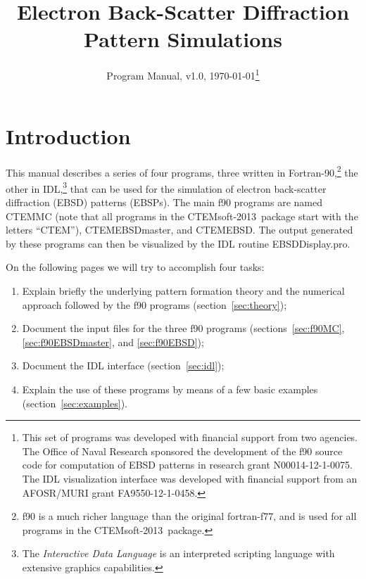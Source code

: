 \documentclass[DIV=calc, paper=letter, fontsize=11pt]{scrartcl}	 %
\title{Electron Back-Scatter Diffraction Pattern Simulations} %
\author{\vspace*{-0.7in}} %
\date{Program Manual, v1.0, \today\protect\footnote{This set of programs was developed with financial support from two agencies. 
The Office of Naval Research sponsored the development of the f90 source code for computation of EBSD patterns in research 
grant N00014-12-1-0075.  The IDL visualization interface was developed with financial support from an AFOSR/MURI grant FA9550-12-1-0458.}}
\newcommand{\ctp}{\textsf{CTEMsoft-2013}}
\begin{document}
\maketitle

\begin{figure}[h]
\leavevmode\centering
{}
\end{figure}

\renewcommand{\contentsname}{Table of Contents}
{\small\tableofcontents}

\newpage
\section{Introduction}
This manual describes a series of four programs, 
three written in Fortran-90,\footnote{f90 is a much richer language than the original fortran-f77, and is
used for all programs in the \ctp\ package.} 
the other in IDL,\footnote{The \textit{Interactive Data Language} is an interpreted scripting language with extensive graphics capabilities.} 
that can be used for the simulation of electron back-scatter diffraction (EBSD) patterns (EBSPs).  The main f90 programs
are named \textsf{CTEMMC} (note that all programs in the \ctp\ package start with the letters ``CTEM''), \textsf{CTEMEBSDmaster},
and \textsf{CTEMEBSD}.
The output generated by these programs can then be visualized by the IDL routine \textsf{EBSDDisplay.pro}.  

On the following pages we will try to accomplish four tasks:
\begin{enumerate}
	\item Explain briefly the underlying pattern formation theory and the numerical approach followed by the f90 programs (section~\ref{sec:theory});
	\item Document the input files for the three f90 programs (sections~\ref{sec:f90MC}, \ref{sec:f90EBSDmaster}, and \ref{sec:f90EBSD});
	\item Document the IDL interface (section~\ref{sec:idl});
	\item Explain the use of these programs by means of a few basic examples (section~\ref{sec:examples}).
\end{enumerate}



\newpage
\end{document}

